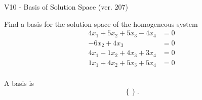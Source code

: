 \begin{exercise}
  \begin{exerciseTitle}V10 - Basis of Solution Space (ver. 207)\end{exerciseTitle}
  \begin{exerciseStatement}
    Find a basis for the solution space of the homogeneous system 
\begin{align*}
 4 x_ 1 + 5 x_ 2 + 5 x_ 3 -4 x_ 4 &= 0  \\ 
  -6 x_ 2 + 4 x_ 3 &= 0  \\ 
  4 x_ 1 -1 x_ 2 + 4 x_ 3 + 3 x_ 4 &= 0  \\ 
  1 x_ 1 + 4 x_ 2 + 5 x_ 3 + 5 x_ 4 &= 0  \\ 
 \end{align*}


 
  \end{exerciseStatement}

  \begin{exerciseAnswer}
   A basis is   
\[\left\{\right\}.\]

  


  \end{exerciseAnswer}
\end{exercise}